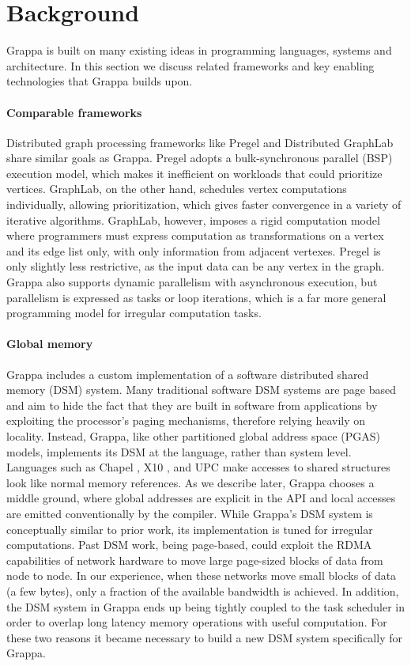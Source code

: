 \section{Background}

Grappa is built on many existing ideas in programming languages, systems and
architecture. In this section we discuss related frameworks and key enabling
technologies that Grappa builds upon.

\paragraph{Comparable frameworks} Distributed graph processing
frameworks like Pregel \cite{pregel:2010} and Distributed GraphLab
\cite{distgraphlab:vldb12} share similar goals as Grappa. Pregel adopts
a bulk-synchronous parallel (BSP) execution model, which makes it
inefficient on workloads that could prioritize vertices. GraphLab, on
the other hand, schedules vertex computations individually, allowing
prioritization, which gives faster convergence in a variety of iterative
algorithms.  GraphLab, however, imposes a rigid computation model where
programmers must express computation as transformations on a vertex and
its edge list only, with only information from adjacent vertexes. Pregel
is only slightly less restrictive, as the input data can be any vertex
in the graph.  Grappa also supports dynamic parallelism with
asynchronous execution, but parallelism is expressed as tasks or loop
iterations, which is a far more general programming model
for irregular computation tasks.

\paragraph{Global memory} Grappa includes a custom implementation of a
software distributed shared memory (DSM) system. Many traditional
software DSM systems are page based~\cite{Treadmarks,munin} and aim to
hide the fact that they are built in software from applications by
exploiting the processor's paging mechanisms, therefore relying heavily
on locality. Instead, Grappa, like other partitioned global address
space (PGAS) models, implements its DSM at the language, rather than
system level. Languages such as Chapel \cite{Chamberlain:2007}, X10
\cite{X10:2005}, and UPC \cite{upc:2005} make accesses to shared
structures look like normal memory references. As we describe later,
Grappa chooses a middle ground, where global addresses are explicit in
the API and local accesses are emitted conventionally by the compiler. 
While Grappa's DSM system is conceptually similar to prior work, its
implementation is tuned for irregular computations.  Past DSM work,
being page-based, could exploit the RDMA capabilities of network
hardware to move large page-sized blocks of data from node to node.  In
our experience, when these networks move small blocks of data (a few
bytes), only a fraction of the available bandwidth is achieved.  In
addition, the DSM system in Grappa ends up being tightly coupled to the
task scheduler in order to overlap long latency memory operations with
useful computation.  For these two reasons it became necessary to build
a new DSM system specifically for Grappa. 


